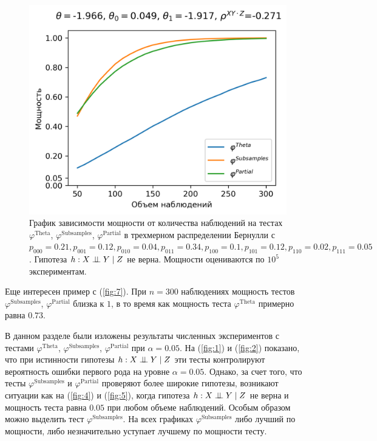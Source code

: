 \begin{figure}[H]
    \centering
    \includegraphics[scale=0.6]{images/graph7.png}
    \caption{График зависимости мощности от количества наблюдений
    на тестах $\varphi^{\text{Theta}}$, $\varphi^{\text{Subsamples}}$, $\varphi^{\text{Partial}}$
    в трехмерном распределении Бернулли с $p_{000}=0.21, p_{001}=0.12, 
    p_{010}=0.04, p_{011}=0.34,
    p_{100}=0.1, p_{101}=0.12, p_{110}=0.02, p_{111}=0.05$. 
    Гипотеза $h: X \perp\!\!\!\perp Y \mid Z$ не верна.
    Мощности оцениваются по $10^5$ экспериментам.} \label{fig:7}
\end{figure}

Еще интересен пример с (\autoref{fig:7}). 
При $n=300$ наблюдениях мощность тестов
$\varphi^{\text{Subsamples}}$, $\varphi^{\text{Partial}}$ близка к $1$,
в то время как мощность теста $\varphi^{\text{Theta}}$ примерно равна $0.73$.

В данном разделе были изложены результаты численных экспериментов с тестами
$\varphi^{\text{Theta}}$, $\varphi^{\text{Subsamples}}$, 
$\varphi^{\text{Partial}}$ при $\alpha=0.05$. На 
(\autoref{fig:1}) и (\autoref{fig:2}) показано, что 
при истинности гипотезы  
$h: X \perp\!\!\!\perp Y \mid Z$ эти тесты контролируют вероятность ошибки первого рода
на уровне $\alpha=0.05$. 
Однако, за счет того, что тесты 
$\varphi^{\text{Subsamples}}$ и
$\varphi^{\text{Partial}}$ проверяют более широкие гипотезы,
возникают ситуации как на 
 (\autoref{fig:4}) и (\autoref{fig:5}), когда гипотеза $h: X \perp\!\!\!\perp Y \mid Z$
не верна и мощность теста равна $0.05$ при любом объеме наблюдений.
Особым образом можно выделить тест $\varphi^{\text{Subsamples}}$.
На всех графиках $\varphi^{\text{Subsamples}}$ либо лучший по мощности,
либо незначительно уступает лучшему по мощности тесту.
